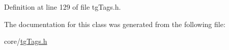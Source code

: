 Definition at line 129 of file tg\-Tags.\-h.



The documentation for this class was generated from the following file\-:\begin{DoxyCompactItemize}
\item 
core/\hyperlink{tg_tags_8h}{tg\-Tags.\-h}\end{DoxyCompactItemize}
